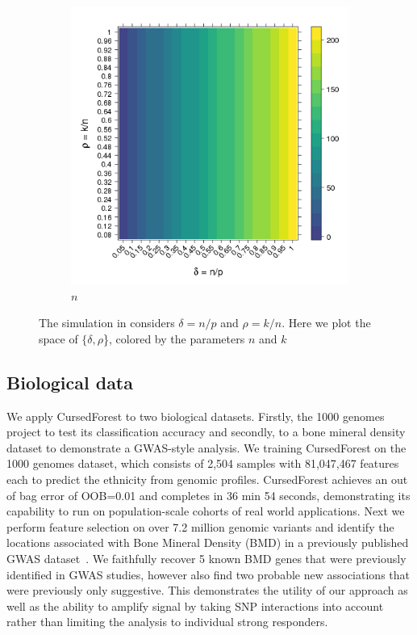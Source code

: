 \documentclass[a4paper]{amsart}
\begin{document}
\begin{figure}[tbhp]
\begin{subfigure}[b]{0.45\linewidth}
      \includegraphics[totalheight=6cm]{../plos16/figs/n.png}
      \caption{$n$}
      \label{figure:n.png}
    \end{subfigure} 
    \caption{The simulation in  considers $\delta = n/p$ and $\rho =k/n$. Here we plot the
      space of $\{ \delta, \rho$\}, colored  by the parameters $n$ and $k$}
\end{figure}

\subsection{Biological data}
We apply CursedForest to two biological datasets. Firstly, the 1000 genomes project to test its classification accuracy and secondly, to a bone mineral density dataset to demonstrate a GWAS-style analysis.
We training CursedForest on the 1000 genomes dataset, which consists of 2,504 samples with 81,047,467 features each to predict the ethnicity from genomic profiles. CursedForest achieves an out of bag error of OOB=0.01 and completes in 36 min 54 seconds, demonstrating its capability to run on population-scale cohorts of real world applications.
Next we perform feature selection on over 7.2 million genomic variants and identify the
locations associated with Bone Mineral Density (BMD) in a previously published GWAS dataset~\cite{Duncan.2011}. We faithfully recover 5 known BMD genes that were previously identified in GWAS studies, however also find two probable new associations that were previously only suggestive. This demonstrates the utility of our approach as well as the ability to amplify signal by taking SNP interactions into account rather than limiting the analysis to individual strong responders. 
\end{document}
